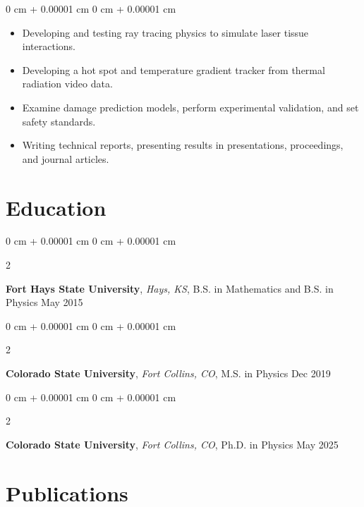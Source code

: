 \documentclass[10pt, letterpaper]{article}
\newenvironment{highlights}{
    \begin{itemize}[
        topsep=0.10 cm,
        parsep=0.10 cm,
        partopsep=0pt,
        itemsep=0pt,
        leftmargin=0 cm + 10pt
    ]
}{
    \end{itemize}
} %
\newenvironment{onecolentry}{
    \begin{adjustwidth}{
        0 cm + 0.00001 cm
    }{
        0 cm + 0.00001 cm
    }
}{
    \end{adjustwidth}
} %
\newenvironment{twocolentry}[2][]{
    \onecolentry
    \def\secondColumn{#2}
    \setcolumnwidth{\fill, 4.5 cm}
    \begin{paracol}{2}
}{
    \switchcolumn \raggedleft \secondColumn
    \end{paracol}
    \endonecolentry
} %
\begin{document}
        \vspace{0.10 cm}
        \begin{onecolentry}
            \begin{highlights}
              \item Developing and testing ray tracing physics to simulate laser tissue interactions.
              \item Developing a hot spot and temperature gradient tracker from thermal radiation video data.
              \item Examine damage prediction models, perform experimental validation, and set safety standards.
              \item Writing technical reports, presenting results in presentations, proceedings, and journal articles.
            \end{highlights}
        \end{onecolentry}


    \section{Education}

        \begin{twocolentry}{
            May 2015
        }
      \textbf{Fort Hays State University}, \textit{Hays, KS}, B.S. in Mathematics and B.S. in Physics\end{twocolentry}

        \vspace{0.10 cm}

        \begin{twocolentry}{
            Dec 2019
        }
      \textbf{Colorado State University}, \textit{Fort Collins, CO}, M.S. in Physics\end{twocolentry}

        \vspace{0.10 cm}

        \begin{twocolentry}{
            May 2025
        }
      \textbf{Colorado State University}, \textit{Fort Collins, CO}, Ph.D. in Physics\end{twocolentry}

        \vspace{0.10 cm}

    \section{Publications}
\end{document}
